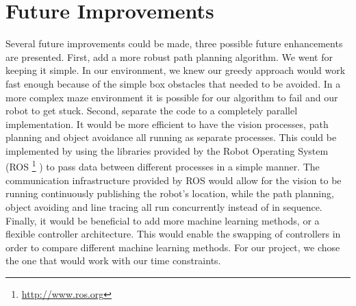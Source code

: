 \section{Future Improvements}
\label{section::future}

Several future improvements could be made, three possible future enhancements are presented. First, add a more robust path planning algorithm. We went for keeping it simple. In our environment, we knew our greedy approach would work fast enough because of the simple box obstacles that needed to be avoided. In a more complex maze environment it is possible for our algorithm to fail and our robot to get stuck. Second, separate the code to a completely parallel implementation. It would be more efficient to have the vision processes, path planning and object avoidance all running as separate processes. This could be implemented by using the libraries provided by the Robot Operating System (ROS \footnote{\url{http://www.ros.org}} ) to pass data between different processes in a simple manner. The communication infrastructure provided by ROS would allow for the vision to be running continuously publishing the robot’s location, while the path planning, object avoiding and line tracing all run concurrently instead of in sequence. Finally, it would be beneficial to add more machine learning methods\cite{i2ml}\cite{ttml}, or a flexible controller architecture\cite{i2amr}. This would enable the swapping of controllers in order to compare different machine learning methods. For our project, we chose the one that would work with our time constraints. 
